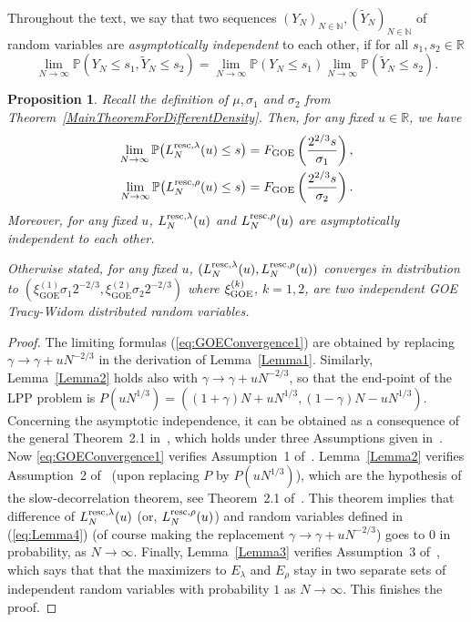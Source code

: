 \documentclass[12pt,a4paper]{article}
\numberwithin{equation}{section}
\newcommand{\GOE}{\mathrm{GOE}}
\newcommand{\Pb}{\mathbb{P}}
\newcommand{\R}{\mathbb{R}}
\newcommand{\N}{\mathbb{N}}
\newtheorem{prop}{Proposition}[section]
\begin{document}
Throughout the text, we say that two sequences $(Y_{N})_{N\in \N},(\tilde{Y}_{N})_{N\in \N}$ of random variables are \emph{asymptotically independent} to each other,
 if for all $s_1, s_2 \in \R$
 \begin{equation}
 \lim_{N \to \infty}\Pb(Y_N \leq s_1, \tilde{Y}_{N}\leq s_2)= \lim_{N \to \infty}\Pb(Y_N \leq s_1) \lim_{N \to \infty}\Pb(\tilde{Y}_{N}\leq s_2).
 \end{equation}
 \begin{prop}\label{ComponentConvergenceProp}
 Recall the definition of $\mu, \sigma_1$ and $\sigma_2$ from Theorem~\ref{MainTheoremForDifferentDensity}. Then, for any fixed $u\in \mathbb{R}$, we have
 \begin{equation}\label{eq:GOEConvergence1}
 \begin{aligned}
 \lim_{N\to \infty} \Pb\big(L^{{\rm resc},\lambda}_{N}(u)\leq s\big)& = F_{\GOE}\left(\frac{2^{2/3}s}{\sigma_1}\right),\\
 \lim_{N\to \infty} \Pb\big(L^{{\rm resc},\rho}_{N}(u)\leq s\big) & = F_{\GOE}\left(\frac{2^{2/3}s}{\sigma_2}\right).
 \end{aligned}
 \end{equation}
 Moreover, for any fixed $u$, $L^{{\rm resc},\lambda}_{N}(u)$ and $L^{{\rm resc},\rho}_{N}(u)$ are asymptotically independent to each other.

Otherwise stated, for any fixed $u$, $(L^{{\rm resc},\lambda}_{N}(u),L^{{\rm resc},\rho}_{N}(u))$ converges in distribution to $(\xi^{(1)}_{\mathrm{GOE}}\sigma_1 2^{-2/3}, \xi^{(2)}_{\mathrm{GOE}}\sigma_2 2^{-2/3})$ where $\xi^{(k)}_{\rm GOE}$, $k=1,2$, are two independent GOE Tracy-Widom distributed random variables.
 \end{prop}
\begin{proof}
The limiting formulas (\ref{eq:GOEConvergence1}) are obtained by replacing $\gamma\to\gamma+u N^{-2/3}$ in the derivation of Lemma~\ref{Lemma1}. Similarly, Lemma~\ref{Lemma2} holds also with $\gamma\to\gamma+u N^{-2/3}$, so that the end-point of the LPP problem is $P(uN^{1/3})=\left((1+\gamma)N+u N^{1/3}, (1-\gamma)N-uN^{1/3}\right)$.
Concerning the asymptotic independence, it can be obtained  as a consequence of the general Theorem~2.1 in~\cite{FN13}, which holds under three Assumptions given in~\cite{FN13}. Now \eqref{eq:GOEConvergence1} verifies Assumption~1 of~\cite{FN13}. Lemma~\ref{Lemma2} verifies Assumption~2 of~\cite{FN13} (upon replacing $P$ by $P(uN^{1/3})$), which are the hypothesis of the slow-decorrelation theorem, see Theorem~2.1 of~\cite{CFP10b}. This theorem implies that difference of $L^{{\rm resc},\lambda}_{N}(u)$ (or, $L^{{\rm resc},\rho}_{N}(u)$) and random variables defined in (\ref{eq:Lemma4}) (of course making the replacement $\gamma\to\gamma+u N^{-2/3}$) goes to $0$ in probability, as $N\to\infty$. Finally, Lemma~\ref{Lemma3} verifies Assumption~3 of~\cite{FN13}, which says that that the maximizers to $E_\lambda$ and $E_\rho$ stay in two separate sets of independent random variables with probability $1$ as $N\to\infty$. This finishes the proof.
\end{proof}
\end{document}
